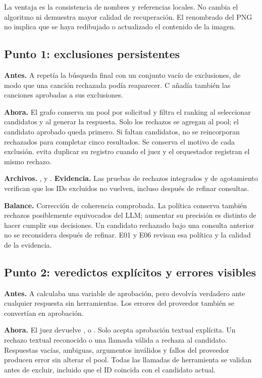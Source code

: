 La ventaja es la consistencia de nombres y referencias locales. No cambia el
algoritmo ni demuestra mayor calidad de recuperación. El renombrado del PNG no
implica que se haya redibujado o actualizado el contenido de la imagen.

\subsection{Punto 1: exclusiones persistentes}
\label{cambio:1}
\textbf{Antes.} A repetía la búsqueda final con un conjunto vacío de exclusiones,
de modo que una canción rechazada podía reaparecer. C añadía también las canciones
aprobadas a sus exclusiones.

\textbf{Ahora.} El grafo conserva un pool por solicitud y filtra el ranking al
seleccionar candidatos y al generar la respuesta. Solo los rechazos se agregan
al pool; el candidato aprobado queda primero. Si faltan candidatos, no se
reincorporan rechazados para completar cinco resultados. Se conserva el motivo
de cada exclusión.  evita duplicar su registro cuando
el juez y el orquestador registran el mismo rechazo.

\textbf{Archivos.} ,  y .
\textbf{Evidencia.} Las pruebas de rechazos integrados y de agotamiento verifican
que los IDs excluidos no vuelven, incluso después de refinar consultas.

\textbf{Balance.} Corrección de coherencia comprobada. La política conserva
también rechazos posiblemente equivocados del LLM; aumentar su precisión es
distinto de hacer cumplir sus decisiones. Un candidato rechazado bajo una
consulta anterior no se reconsidera después de refinar. E01 y E06 revisan esa
política y la calidad de la evidencia.

\subsection{Punto 2: veredictos explícitos y errores visibles}
\label{cambio:2}
\textbf{Antes.} A calculaba una variable de aprobación, pero devolvía verdadero
ante cualquier respuesta sin herramientas. Los errores del proveedor también
se convertían en aprobación.

\textbf{Ahora.} El juez devuelve ,  o .
Solo acepta aprobación textual explícita. Un rechazo textual reconocido o una
llamada válida a  rechaza al candidato. Respuestas vacías,
ambiguas, argumentos inválidos y fallos del proveedor producen error sin alterar
el pool. Todas las llamadas de herramienta se validan antes de excluir, incluido
que el ID coincida con el candidato actual.

